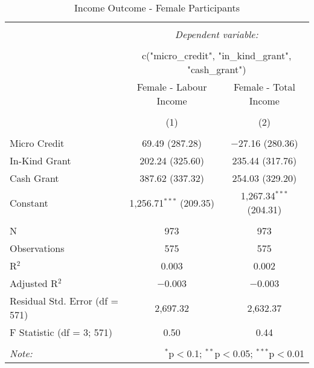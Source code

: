 
\begin{table}[!htbp] \centering 
  \caption{Income Outcome - Female Participants} 
  \label{} 
\small 
\begin{tabular}{@{\extracolsep{5pt}}lcc} 
\\[-1.8ex]\hline 
\hline \\[-1.8ex] 
 & \multicolumn{2}{c}{\textit{Dependent variable:}} \\ 
\cline{2-3} 
\\[-1.8ex] & \multicolumn{2}{c}{c("micro\_credit", "in\_kind\_grant", "cash\_grant")} \\ 
 & Female - Labour Income & Female - Total Income \\ 
\\[-1.8ex] & (1) & (2)\\ 
\hline \\[-1.8ex] 
 Micro Credit & 69.49 (287.28) & $-$27.16 (280.36) \\ 
  In-Kind Grant & 202.24 (325.60) & 235.44 (317.76) \\ 
  Cash Grant & 387.62 (337.32) & 254.03 (329.20) \\ 
  Constant & 1,256.71$^{***}$ (209.35) & 1,267.34$^{***}$ (204.31) \\ 
 \hline \\[-1.8ex] 
N & 973 & 973 \\ 
Observations & 575 & 575 \\ 
R$^{2}$ & 0.003 & 0.002 \\ 
Adjusted R$^{2}$ & $-$0.003 & $-$0.003 \\ 
Residual Std. Error (df = 571) & 2,697.32 & 2,632.37 \\ 
F Statistic (df = 3; 571) & 0.50 & 0.44 \\ 
\hline 
\hline \\[-1.8ex] 
\textit{Note:}  & \multicolumn{2}{r}{$^{*}$p$<$0.1; $^{**}$p$<$0.05; $^{***}$p$<$0.01} \\ 
\end{tabular} 
\end{table} 
